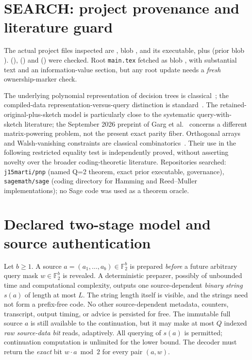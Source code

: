 \documentclass[10pt]{article}
\newcommand{\F}{\mathbb F_2}
\begin{document}
\section{SEARCH: project provenance and literature guard}
The actual project files inspected are , blob , and its executable, plus  (prior blob ).  (),  () and  () were checked. Root \texttt{main.tex} fetched as blob , with substantial text and an information-value section, but any root update needs a \emph{fresh} ownership-marker check.

The underlying polynomial representation of decision trees is classical~\cite{nisan1994}; the compiled-data representation-versus-query distinction is standard~\cite{darwiche2002}. The retained-original-plus-sketch model is particularly close to the systematic query-with-sketch literature; the September 2026 preprint of Garg et al.~\cite{garg2026} concerns a different matrix-powering problem, not the present exact parity fiber. Orthogonal arrays and Walsh-vanishing constraints are classical combinatorics~\cite{bierbrauer1995}. Their use in the following restricted equality test is independently proved, without asserting novelty over the broader coding-theoretic literature. Repositories searched: \texttt{j15marti/pnp} (named Q=2 theorem, exact prior executable, governance), \texttt{sagemath/sage} (coding directory for Hamming and Reed--Muller implementations); no Sage code was used as a theorem oracle.

\section{Declared two-stage model and source authentication}
Let \(b\ge1\). A source \(a=(a_1,\ldots,a_b)\in\F^b\) is prepared \emph{before} a future arbitrary query mask \(w\in\F^b\) is revealed. A deterministic preparer, possibly of unbounded time and computational complexity, outputs one source-dependent \emph{binary string} \(s(a)\) of length at most \(L\). The string length itself is visible, and the strings need not form a prefix-free code. No other source-dependent metadata, counters, transcript, output timing, or advice is persisted for free. The immutable full source \(a\) is still available to the continuation, but it may make at most \(Q\) indexed \emph{raw source-data bit} reads, adaptively. All querying of \(s(a)\) is permitted; continuation computation is unlimited for the lower bound. The decoder must return the \emph{exact} bit \(w\cdot a\bmod 2\) for every pair \((a,w)\).
\end{document}
